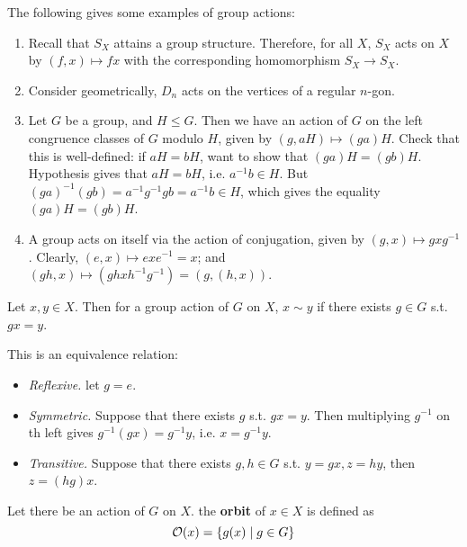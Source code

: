 \documentclass{article}
\begin{document}
\begin{example}
    The following gives some examples of group actions:
    \begin{enumerate}
        \item Recall that $S_X$ attains a group structure. Therefore, for all $X$, $S_X$ acts on $X$ by $(f, x) \mapsto fx$ with the corresponding homomorphism $S_X \to S_X$.
        \item Consider geometrically, $D_n$ acts on the vertices of a regular $n$-gon.
        \item Let $G$ be a group, and $H \leq G$. Then we have an action of $G$ on the left congruence classes of $G$ modulo $H$, given by $(g, aH) \mapsto (ga) H$. Check that this is well-defined: if $aH = bH$, want to show that $(ga)H = (gb)H$. Hypothesis gives that $aH = bH$, i.e. $a^{-1}b \in H$. But $(ga)^{-1}(gb) = a^{-1} g^{-1} g b = a^{-1}b \in H$, which gives the equality $(ga)H = (gb) H$.
        \item A group acts on itself via the action of conjugation, given by $(g, x) \mapsto gxg^{-1}$. Clearly, $(e, x) \mapsto exe^{-1} = x$; and $(gh, x) \mapsto (ghxh^{-1} g^{-1}) = (g, (h, x))$.
    \end{enumerate}
\end{example}

\begin{definition}
    Let $x, y \in X$. Then for a group action of $G$ on $X$, $x \sim y$ if there exists $g \in G$ s.t. $gx = y$.
\end{definition}

\begin{remark}
    This is an equivalence relation:
    \begin{itemize}
        \item \emph{Reflexive.} let $g = e$.
        \item \emph{Symmetric.} Suppose that there exists $g$ s.t. $gx = y$. Then multiplying $g^{-1}$ on th left gives $g^{-1}(gx) = g^{-1}y$, i.e. $x = g^{-1} y$.
        \item \emph{Transitive.} Suppose that there exists $g, h \in G$ s.t. $y = gx, z = hy$, then $z = (hg)x$.
    \end{itemize}
\end{remark}

\begin{definition}[Orbit]
    Let there be an action of $G$ on $X$. the \textbf{orbit} of $x \in X$ is defined as
    \[
        \mathcal{O}(x) = \{ g(x) \mid g \in G \}
    \]
\end{definition}
\end{document}
